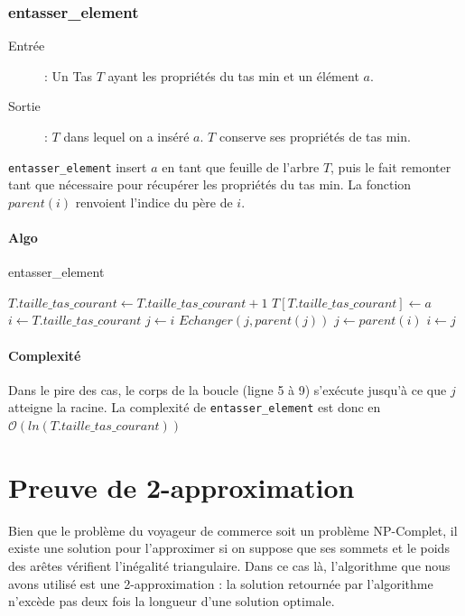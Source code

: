 \documentclass[a4paper,11pt]{article}
\begin{document}
\subsubsection*{entasser\_element}
\begin{description}
\item[Entrée] :  Un \textsf{Tas} $T$ ayant les propriétés du tas min et un élément $a$.
\item[Sortie] :  $T$ dans lequel on a inséré $a$. $T$ conserve ses propriétés de tas min.
\end{description}
\texttt{entasser\_element} insert $a$ en tant que feuille de l'arbre $T$, puis le fait remonter tant que nécessaire pour récupérer les propriétés du tas min.
La fonction $parent(i)$ renvoient l'indice du père de $i$.
\paragraph*{Algo}
\begin{algorithm}
\caption{entasser\_element}
\begin{algorithmic}[1]
\STATE $T.taille\_tas\_courant \leftarrow T.taille\_tas\_courant + 1$
\STATE $T\left[T.taille\_tas\_courant\right] \leftarrow a$
\STATE $i \leftarrow T.taille\_tas\_courant$
\STATE $j \leftarrow i$
\STATE $Echanger(j, parent(j))$
\STATE $j \leftarrow parent(i)$
\STATE $i \leftarrow j$
\ENDWHILE
\end{algorithmic}
\end{algorithm}
\paragraph*{Complexité}
Dans le pire des cas, le corps de la boucle (ligne 5 à 9) s'exécute jusqu'à ce que $j$ atteigne la racine. La complexité de \texttt{entasser\_element} est donc en $\mathcal{O}(ln(T.taille\_tas\_courant))$


\section{Preuve de 2-approximation} %
Bien que le problème du voyageur de commerce soit un problème NP-Complet, il existe une solution pour l'approximer si on suppose que ses sommets et le poids des arêtes vérifient l'inégalité triangulaire. Dans ce cas là, l'algorithme que nous avons utilisé est une 2-approximation : la solution retournée par l'algorithme n'excède pas deux fois la longueur d'une solution optimale.
\end{document}
